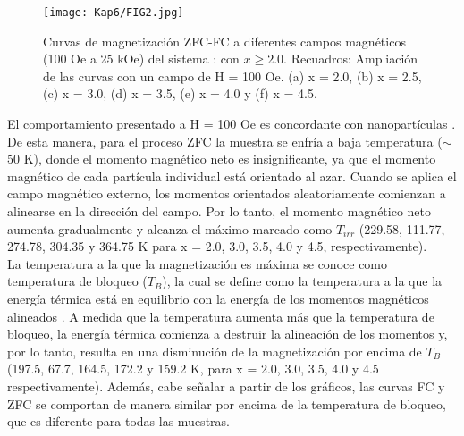 \begin{figure}[H]
  \centering%

  \texttt{[image: Kap6/FIG2.jpg]}%
  \caption{Curvas de magnetización ZFC-FC a diferentes campos magnéticos (100
  Oe a 25 kOe) del sistema : con $x \geq
    2.0$. Recuadros: Ampliación de las curvas con un campo de H = 100 Oe. (a) x =
  2.0, (b) x = 2.5, (c) x = 3.0, (d) x = 3.5, (e) x = 4.0 y (f) x = 4.5. }
  \label{fig:zfc}
\end{figure}

El comportamiento presentado a H = 100 Oe es concordante con nanopartículas
\@{}
\cite{singh2017shape,gaona2021characterization}. De esta manera, para el proceso ZFC la muestra se enfría a baja
temperatura ($\sim $ 50 K), donde el momento magnético neto es insignificante,
ya que
el momento magnético de cada partícula individual está orientado al azar.
Cuando se aplica el campo magnético externo, los momentos orientados
aleatoriamente comienzan a alinearse en la dirección del campo. Por lo tanto,
el momento magnético neto aumenta gradualmente y alcanza el máximo marcado como
$T_{irr}$ (229.58, 111.77, 274.78, 304.35 y 364.75 K para x = 2.0, 3.0, 3.5,
4.0 y
4.5, respectivamente).\\

La temperatura a la que la magnetización es máxima se conoce como temperatura
de bloqueo ($T_B$), la cual se define como la temperatura a la que la energía
térmica está en equilibrio con la energía de los momentos magnéticos alineados
\cite{shao2018preparation}.
A medida que la temperatura aumenta más que la temperatura de bloqueo, la
energía térmica comienza a destruir la alineación de los momentos y, por lo
tanto, resulta en una disminución de la magnetización por encima de $T_B$
(197.5,
67.7, 164.5, 172.2 y 159.2 K, para x = 2.0, 3.0, 3.5, 4.0 y 4.5
respectivamente).
Además, cabe señalar a partir de los gráficos, las curvas FC
y ZFC se comportan de manera similar por encima de la temperatura de bloqueo,
que es diferente para todas las muestras.\\


